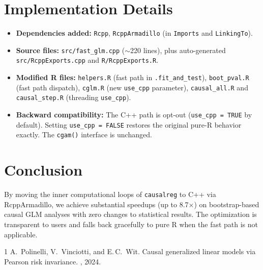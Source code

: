 \documentclass[11pt,a4paper]{article}
\begin{document}
\section{Implementation Details}

\begin{itemize}
  \item \textbf{Dependencies added:} \texttt{Rcpp}, \texttt{RcppArmadillo}
    (in \texttt{Imports} and \texttt{LinkingTo}).
  \item \textbf{Source files:} \texttt{src/fast\_glm.cpp} ($\sim$220 lines),
    plus auto-generated \texttt{src/RcppExports.cpp} and
    \texttt{R/RcppExports.R}.
  \item \textbf{Modified R files:} \texttt{helpers.R} (fast path in
    \texttt{.fit\_and\_test}), \texttt{boot\_pval.R} (fast path dispatch),
    \texttt{cglm.R} (new \texttt{use\_cpp} parameter),
    \texttt{causal\_all.R} and \texttt{causal\_step.R} (threading
    \texttt{use\_cpp}).
  \item \textbf{Backward compatibility:} The C++ path is opt-out
    (\texttt{use\_cpp = TRUE} by default).  Setting \texttt{use\_cpp = FALSE}
    restores the original pure-R behavior exactly.  The \texttt{cgam()}
    interface is unchanged.
\end{itemize}

\section{Conclusion}

By moving the inner computational loops of \texttt{causalreg} to C++ via
RcppArmadillo, we achieve substantial speedups (up to 8.7$\times$) on
bootstrap-based causal GLM analyses with zero changes to statistical results.
The optimization is transparent to users and falls back gracefully to pure R
when the fast path is not applicable.

\begin{thebibliography}{1}
A.~Polinelli, V.~Vinciotti, and E.\,C.~Wit.
\newblock Causal generalized linear models via {P}earson risk invariance.
, 2024.
\end{thebibliography}
\end{document}
